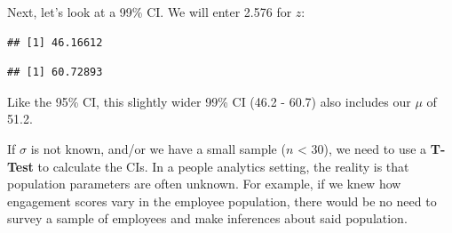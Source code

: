 \documentclass[]{book}
\newenvironment{Shaded}{\begin{snugshade}}{\end{snugshade}}
\newcommand{\CommentTok}[1]{\textcolor[rgb]{0.56,0.35,0.01}{\textit{#1}}}
\newcommand{\DecValTok}[1]{\textcolor[rgb]{0.00,0.00,0.81}{#1}}
\newcommand{\FloatTok}[1]{\textcolor[rgb]{0.00,0.00,0.81}{#1}}
\newcommand{\KeywordTok}[1]{\textcolor[rgb]{0.13,0.29,0.53}{\textbf{#1}}}
\newcommand{\NormalTok}[1]{#1}
\newcommand{\OperatorTok}[1]{\textcolor[rgb]{0.81,0.36,0.00}{\textbf{#1}}}
\newcommand{\StringTok}[1]{\textcolor[rgb]{0.31,0.60,0.02}{#1}}
\begin{document}
Next, let's look at a 99\% CI. We will enter 2.576 for \(z\):

\begin{Shaded}
\end{Shaded}

\begin{Shaded}
\end{Shaded}

\begin{verbatim}
## [1] 46.16612
\end{verbatim}

\begin{Shaded}
\end{Shaded}

\begin{verbatim}
## [1] 60.72893
\end{verbatim}

Like the 95\% CI, this slightly wider 99\% CI (46.2 - 60.7) also includes our \(\mu\) of 51.2.

If \(\sigma\) is not known, and/or we have a small sample (\(n\) \textless{} 30), we need to use a \textbf{T-Test} to calculate the CIs. In a people analytics setting, the reality is that population parameters are often unknown. For example, if we knew how engagement scores vary in the employee population, there would be no need to survey a sample of employees and make inferences about said population.
\end{document}
